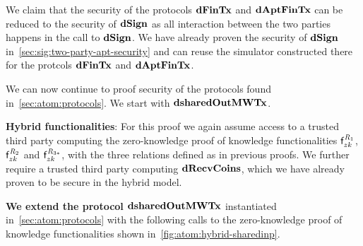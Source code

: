 We claim that the security of the protocols $\mathbf{dFinTx}$ and $\mathbf{dAptFinTx}$ can be reduced to the security of $\mathbf{dSign}$ as all interaction between the two parties happens in the call to $\mathbf{dSign}$.
We have already proven the security of $\mathbf{dSign}$ in~\cref{sec:sig:two-party-apt-security} and can reuse the simulator constructed there for the protcols $\mathbf{dFinTx}$ and $\mathbf{dAptFinTx}$.

We can now continue to proof security of the protocols found in~\cref{sec:atom:protocols}.
We start with $\mathbf{dsharedOutMWTx}$.

\textbf{Hybrid functionalities}: For this proof we again assume access to a trusted third party computing the zero-knowledge proof of knowledge functionalities $\mathsf{f}^{\mathit{R}_1}_{zk}$, $\mathsf{f}^{\mathit{R}_2}_{zk}$ and $\mathsf{f}^{\mathit{R}_{3*}}_{zk}$, with the three relations defined as in previous proofs.
We further require a trusted third party computing $\mathbf{dRecvCoins}$, which we have already proven to be secure in the hybrid model.

\textbf{We extend the protocol $\mathbf{dsharedOutMWTx}$} instantiated in~\cref{sec:atom:protocols} with the following calls to the zero-knowledge proof of knowledge functionalities shown in~\cref{fig:atom:hybrid-sharedinp}.


